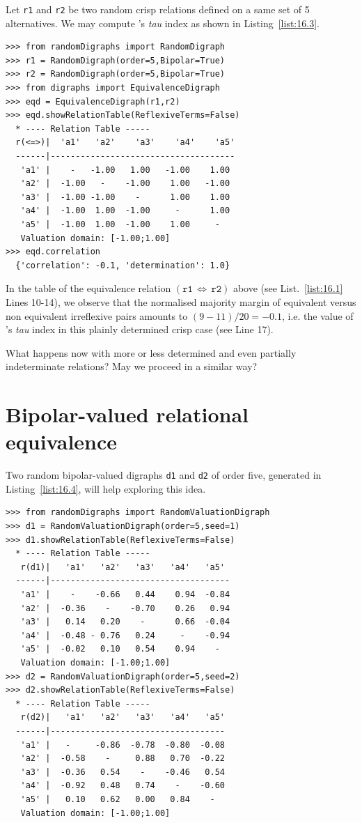 Let \texttt{r1} and \texttt{r2} be two random crisp relations defined on a same set of 5 alternatives. We may compute \Kendall 's \emph{tau} index as shown in Listing~\vref{list:16.3}.
\begin{lstlisting}[caption={Computing a relational equivalence digraph},label=list:16.3]
>>> from randomDigraphs import RandomDigraph
>>> r1 = RandomDigraph(order=5,Bipolar=True)
>>> r2 = RandomDigraph(order=5,Bipolar=True)
>>> from digraphs import EquivalenceDigraph
>>> eqd = EquivalenceDigraph(r1,r2)
>>> eqd.showRelationTable(ReflexiveTerms=False)
  * ---- Relation Table -----
  r(<=>)|  'a1'	  'a2'	  'a3'	  'a4'	  'a5'	  
  ------|-------------------------------------
   'a1' |    -   -1.00   1.00   -1.00    1.00	 
   'a2' |  -1.00   -    -1.00    1.00   -1.00	 
   'a3' |  -1.00 -1.00    -      1.00    1.00	 
   'a4' |  -1.00  1.00  -1.00     -      1.00	 
   'a5' |  -1.00  1.00  -1.00    1.00     - 	 
   Valuation domain: [-1.00;1.00]
>>> eqd.correlation
  {'correlation': -0.1, 'determination': 1.0}
\end{lstlisting}

In the table of the equivalence relation $(\mathtt{r1}\, \Leftrightarrow\, \mathtt{r2})$ above (see List.~\vref{list:16.1} Lines 10-14), we observe that the normalised majority margin of equivalent versus non equivalent irreflexive pairs amounts to $(9 - 11)/20 = -0.1$, i.e. the value of \Kendall 's \emph{tau} index in this plainly determined crisp case (see Line 17).

What happens now with more or less determined and even partially indeterminate relations? May we proceed in a similar way?

\section{Bipolar-valued relational equivalence}
\label{sec:16.3}

Two random bipolar-valued digraphs \texttt{d1} and \texttt{d2} of order five, generated in Listing~\vref{list:16.4}, will help exploring this idea.
\begin{lstlisting}[caption={Two random bipolar-valued digraphs},label=list:16.4]
>>> from randomDigraphs import RandomValuationDigraph
>>> d1 = RandomValuationDigraph(order=5,seed=1)
>>> d1.showRelationTable(ReflexiveTerms=False)
  * ---- Relation Table -----
   r(d1)|   'a1'   'a2'   'a3'   'a4'   'a5'	  
  ------|------------------------------------
   'a1' |    - 	  -0.66	  0.44	  0.94	-0.84	 
   'a2' |  -0.36    - 	 -0.70	  0.26	 0.94	 
   'a3' |   0.14   0.20	   - 	  0.66	-0.04	 
   'a4' |  -0.48 - 0.76	  0.24	   -  	-0.94	 
   'a5' |  -0.02   0.10	  0.54	  0.94    - 	 
   Valuation domain: [-1.00;1.00]
>>> d2 = RandomValuationDigraph(order=5,seed=2)
>>> d2.showRelationTable(ReflexiveTerms=False)
  * ---- Relation Table -----
   r(d2)|   'a1'   'a2'   'a3'   'a4'   'a5'	  
  ------|-----------------------------------
   'a1' |   -     -0.86  -0.78  -0.80  -0.08	 
   'a2' |  -0.58    -     0.88   0.70  -0.22	 
   'a3' |  -0.36   0.54    -    -0.46   0.54	 
   'a4' |  -0.92   0.48   0.74    -    -0.60	 
   'a5' |   0.10   0.62   0.00   0.84    - 	 
   Valuation domain: [-1.00;1.00]
\end{lstlisting}

